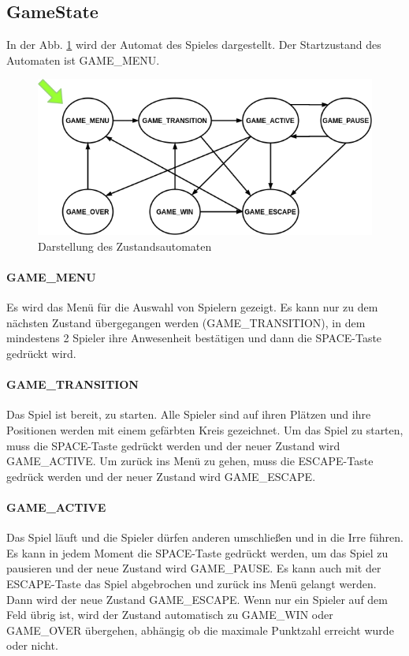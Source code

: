 \documentclass[doktyp=studarbeit]{TUBAFarbeiten}
\begin{document}
\FloatBarrier
\subsection{GameState}

In der Abb. \ref{fig:state-machine} wird der Automat des Spieles dargestellt. 
Der Startzustand des Automaten ist GAME\_MENU. 

\begin{figure}
    \centering
    \includegraphics[width=0.7\linewidth]{state_machine.png}
	\caption{Darstellung des Zustandsautomaten}
	\label{fig:state-machine}
\end{figure}

\paragraph{GAME\_MENU}
Es wird das Menü für die Auswahl von Spielern gezeigt. Es kann nur zu dem
nächsten Zustand übergegangen werden (GAME\_TRANSITION), in dem mindestens 
2 Spieler
ihre Anwesenheit bestätigen und dann die SPACE-Taste gedrückt wird.
\paragraph{GAME\_TRANSITION}
Das Spiel ist bereit, zu starten. Alle Spieler sind auf ihren Plätzen und ihre
Positionen werden mit einem gefärbten Kreis gezeichnet. Um das Spiel zu starten,
muss die SPACE-Taste gedrückt werden und der neuer Zustand wird GAME\_ACTIVE. 
Um zurück ins Menü zu gehen, muss die ESCAPE-Taste gedrück werden und 
der neuer Zustand wird GAME\_ESCAPE.
\paragraph{GAME\_ACTIVE}
Das Spiel läuft und die Spieler dürfen anderen umschließen und in die Irre führen.
Es kann in jedem Moment die SPACE-Taste gedrückt werden, um das Spiel zu pausieren
und der neue Zustand wird GAME\_PAUSE. Es kann auch mit der ESCAPE-Taste das
Spiel abgebrochen und zurück ins Menü gelangt werden. Dann wird der 
neue Zustand GAME\_ESCAPE. 
Wenn nur ein Spieler auf dem Feld übrig ist, wird der Zustand
automatisch zu GAME\_WIN oder GAME\_OVER übergehen, abhängig ob die maximale 
Punktzahl erreicht wurde oder nicht.
\end{document}
